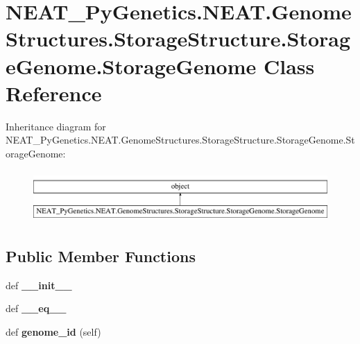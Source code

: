 \hypertarget{class_n_e_a_t___py_genetics_1_1_n_e_a_t_1_1_genome_structures_1_1_storage_structure_1_1_storage_genome_1_1_storage_genome}{}\section{N\+E\+A\+T\+\_\+\+Py\+Genetics.\+N\+E\+A\+T.\+Genome\+Structures.\+Storage\+Structure.\+Storage\+Genome.\+Storage\+Genome Class Reference}
\label{class_n_e_a_t___py_genetics_1_1_n_e_a_t_1_1_genome_structures_1_1_storage_structure_1_1_storage_genome_1_1_storage_genome}
Inheritance diagram for N\+E\+A\+T\+\_\+\+Py\+Genetics.\+N\+E\+A\+T.\+Genome\+Structures.\+Storage\+Structure.\+Storage\+Genome.\+Storage\+Genome\+:\begin{figure}[H]
\begin{center}
\leavevmode
\includegraphics[height=2.000000cm]{class_n_e_a_t___py_genetics_1_1_n_e_a_t_1_1_genome_structures_1_1_storage_structure_1_1_storage_genome_1_1_storage_genome}
\end{center}
\end{figure}
\subsection*{Public Member Functions}
\begin{DoxyCompactItemize}
\item 
def {\bfseries \+\_\+\+\_\+init\+\_\+\+\_\+}\hypertarget{class_n_e_a_t___py_genetics_1_1_n_e_a_t_1_1_genome_structures_1_1_storage_structure_1_1_storage_genome_1_1_storage_genome_a8b7615cf97ad4ce4c3805ecde57637c8}{}\label{class_n_e_a_t___py_genetics_1_1_n_e_a_t_1_1_genome_structures_1_1_storage_structure_1_1_storage_genome_1_1_storage_genome_a8b7615cf97ad4ce4c3805ecde57637c8}

\item 
def {\bfseries \+\_\+\+\_\+eq\+\_\+\+\_\+}\hypertarget{class_n_e_a_t___py_genetics_1_1_n_e_a_t_1_1_genome_structures_1_1_storage_structure_1_1_storage_genome_1_1_storage_genome_a0d0ae3acf7162d05cb40fe5eaff9ada9}{}\label{class_n_e_a_t___py_genetics_1_1_n_e_a_t_1_1_genome_structures_1_1_storage_structure_1_1_storage_genome_1_1_storage_genome_a0d0ae3acf7162d05cb40fe5eaff9ada9}

\item 
def {\bfseries genome\+\_\+id} (self)\hypertarget{class_n_e_a_t___py_genetics_1_1_n_e_a_t_1_1_genome_structures_1_1_storage_structure_1_1_storage_genome_1_1_storage_genome_a536876e28c6ee27477de23a369e11daa}{}\label{class_n_e_a_t___py_genetics_1_1_n_e_a_t_1_1_genome_structures_1_1_storage_structure_1_1_storage_genome_1_1_storage_genome_a536876e28c6ee27477de23a369e11daa}

\end{DoxyCompactItemize}
